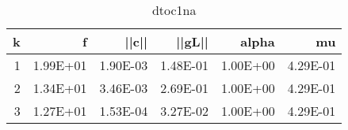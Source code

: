 \documentclass[12pt]{article}
\begin{document}
\pagebreak

\begin{table}[htbp]
  \centering
  \caption{dtoc1na}
    \begin{tabular}{rrrrrr}
    \toprule
    k     & f     & ||c|| & ||gL||   & alpha & mu \\
    \midrule
    1     & 1.99E+01 & 1.90E-03 & 1.48E-01 & 1.00E+00 & 4.29E-01 \\
    2     & 1.34E+01 & 3.46E-03 & 2.69E-01 & 1.00E+00 & 4.29E-01 \\
    3     & 1.27E+01 & 1.53E-04 & 3.27E-02 & 1.00E+00 & 4.29E-01 \\

\end{tabular}
\end{table}
\end{document}
